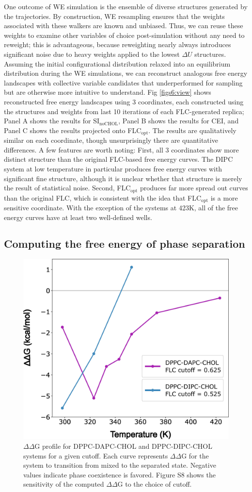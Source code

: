 \documentclass{biophys-new}
\begin{document}
One outcome of WE simulation is the ensemble of diverse structures generated by the trajectories.
By construction, WE resampling ensures that the weights associated with these walkers are known and unbiased.
Thus, we can reuse these weights to examine other variables of choice post-simulation without any need to reweight; this is advantageous, because reweighting nearly always introduces significant noise due to heavy weights applied to the lowest $\Delta U$ structures.
Assuming the initial configurational distribution relaxed into an equilibrium distribution during the WE simulations,
we can reconstruct analogous free energy landscapes with collective variable candidates that underperformed for sampling but are otherwise more intuitive to understand.
Fig \ref{figs6:view} shows reconstructed free energy landscapes using 3 coordinates, each constructed using the structures and weights from last 10 iterations of each FLC-generated replica; Panel A shows the results for $\text{SI}_{\text{noCHOL}}$, Panel B shows the results for CEI, and Panel C shows the results projected onto FLC$_{\text{opt}}$.
The results are qualitatively similar on each coordinate, though unsurprisingly there are quantitative differences. A few features are worth noting: First, all 3 coordinates show more distinct structure than the original FLC-based free energy curves. The DIPC system at low temperature in particular produces free energy curves with significant fine structure, although it is unclear whether that structure is merely the result of statistical noise. Second, FLC$_{\text{opt}}$ produces far more spread out curves than the original FLC, which is consistent with the idea that FLC$_{\text{opt}}$ is a more sensitive coordinate. With the exception of the systems at 423K, all of the free energy curves have at least two well-defined wells.

\subsection*{Computing the free energy of phase separation}

\begin{figure}[hbt!]
    \centering
    \includegraphics[width=0.5\linewidth]{Figures/Main/7/placeholder.jpg}
    \caption{$\Delta\Delta$G profile for DPPC-DAPC-CHOL and DPPC-DIPC-CHOL systems for a given cutoff. Each curve represents $\Delta\Delta$G for the system to transition from mixed to the separated state. Negative values indicate phase coexistence is favored. Figure S8 shows the sensitivity of the computed $\Delta\Delta$G to the choice of cutoff.}
    \label{figs7:view}
\end{figure}
\end{document}
